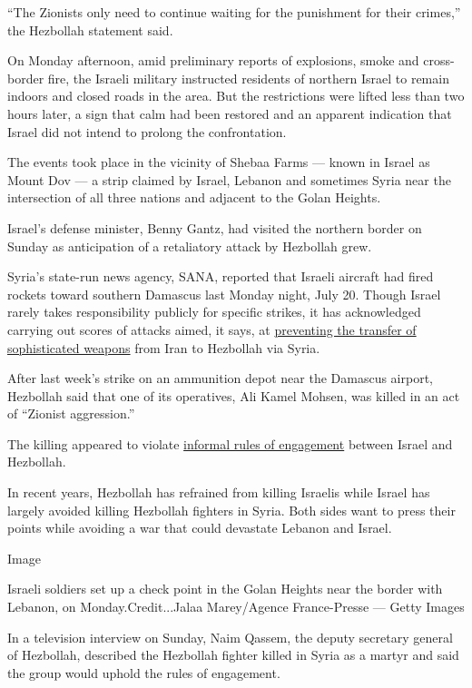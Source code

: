 ``The Zionists only need to continue waiting for the punishment for
their crimes,'' the Hezbollah statement said.

On Monday afternoon, amid preliminary reports of explosions, smoke and
cross-border fire, the Israeli military instructed residents of northern
Israel to remain indoors and closed roads in the area. But the
restrictions were lifted less than two hours later, a sign that calm had
been restored and an apparent indication that Israel did not intend to
prolong the confrontation.

The events took place in the vicinity of Shebaa Farms --- known in
Israel as Mount Dov --- a strip claimed by Israel, Lebanon and sometimes
Syria near the intersection of all three nations and adjacent to the
Golan Heights.

Israel's defense minister, Benny Gantz, had visited the northern border
on Sunday as anticipation of a retaliatory attack by Hezbollah grew.

Syria's state-run news agency, SANA, reported that Israeli aircraft had
fired rockets toward southern Damascus last Monday night, July 20.
Though Israel rarely takes responsibility publicly for specific strikes,
it has acknowledged carrying out scores of attacks aimed, it says, at
\href{https://www.nytimes.com/2019/08/28/world/middleeast/israel-iran-shadow-war.html?action=click\&module=RelatedLinks\&pgtype=Article}{preventing
the transfer of sophisticated weapons} from Iran to Hezbollah via Syria.

After last week's strike on an ammunition depot near the Damascus
airport, Hezbollah said that one of its operatives, Ali Kamel Mohsen,
was killed in an act of ``Zionist aggression.''

The killing appeared to violate
\href{https://www.nytimes.com/2019/08/28/world/middleeast/israel-iran-shadow-war.html}{informal
rules of engagement} between Israel and Hezbollah.

In recent years, Hezbollah has refrained from killing Israelis while
Israel has largely avoided killing Hezbollah fighters in Syria. Both
sides want to press their points while avoiding a war that could
devastate Lebanon and Israel.

Image

Israeli soldiers set up a check point in the Golan Heights near the
border with Lebanon, on Monday.Credit...Jalaa Marey/Agence France-Presse
--- Getty Images

In a television interview on Sunday, Naim Qassem, the deputy secretary
general of Hezbollah, described the Hezbollah fighter killed in Syria as
a martyr and said the group would uphold the rules of engagement.


